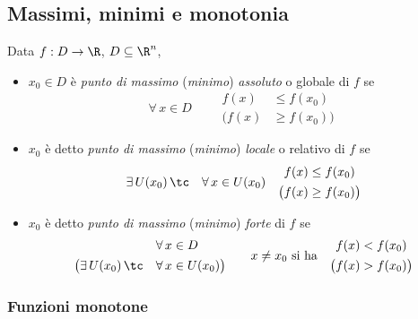 
\subsection{Massimi, minimi e monotonia}

Data $ f:D\to \R $, $ D \subseteq \R^{n} $, 
\begin{itemize}
\item $ x_0 \in D $ è \textit{punto di massimo} (\textit{minimo}) \textit{assoluto} o globale di $ f $ se \begin{equation}
    \forall\, x \in D\qquad \begin{aligned}
        f(x)&\le f(x_0)\\
        \bigl(f(x)&\ge f(x_0)\bigr)
    \end{aligned}
\end{equation}
\item $ x_0 $ è detto \textit{punto di massimo} (\textit{minimo}) \textit{locale} o relativo di $ f $ se \begin{equation}
    \exists\, U(x_0)\,\tc\quad \forall\, x \in U(x_0)\quad \begin{aligned}
        f(x)&\le f(x_0)\\
        \bigl(f(x)&\ge f(x_0)\bigr)
    \end{aligned}
\end{equation}
\item $ x_0 $ è detto \textit{punto di massimo} (\textit{minimo}) \textit{forte} di $ f $ se \begin{equation}
    \begin{aligned}
        \forall\, x &\in D\\
        \bigl(\exists\, U(x_0)\,\tc\quad \forall\, x &\in U(x_0)\bigr)
    \end{aligned}\qquad
     x\neq x_0\text{ si ha}\quad \begin{aligned}
        f(x)&< f(x_0)\\
        \bigl(f(x)&> f(x_0)\bigr)
    \end{aligned}
\end{equation}
\end{itemize}

\subsubsection{Funzioni monotone}   

